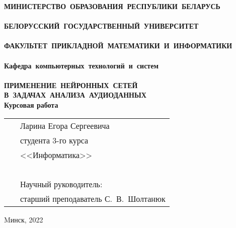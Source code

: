 \setcounter{page}{1}
\thispagestyle{empty}
\begin{center}
\bf
\vspace{4cm}
{
\mbox{МИНИСТЕРСТВО~ОБРАЗОВАНИЯ~РЕСПУБЛИКИ~БЕЛАРУСЬ} \\~\\
\mbox{БЕЛОРУССКИЙ~ГОСУДАРСТВЕННЫЙ~УНИВЕРСИТЕТ} \\~\\
\mbox{ФАКУЛЬТЕТ~ПРИКЛАДНОЙ~МАТЕМАТИКИ~И~ИНФОРМАТИКИ} \\~\\
\mbox{Кафедра~компьютерных~технологий~и~систем} \\~\\
}
\vspace{4cm}
\bf
ПРИМЕНЕНИЕ~НЕЙРОННЫХ~СЕТЕЙ\\
В~ЗАДАЧАХ~АНАЛИЗА~АУДИОДАННЫХ\\
\vspace{1cm}
\rm Курсовая работа 
\vspace{3cm}
\end{center}
\begin{tabular}{ll}
\hspace{10.5cm}
&Ларина Егора Сергеевича~\\
&студента 3-го курса\\
&<<Информатика>>\\~\\
&Научный руководитель:\\
&старший преподаватель С.~В.~Шолтанюк
\end{tabular}
\vspace{4cm}
\begin{center}
Mинск, 2022
\end{center}
\clearpage
\restoregeometry